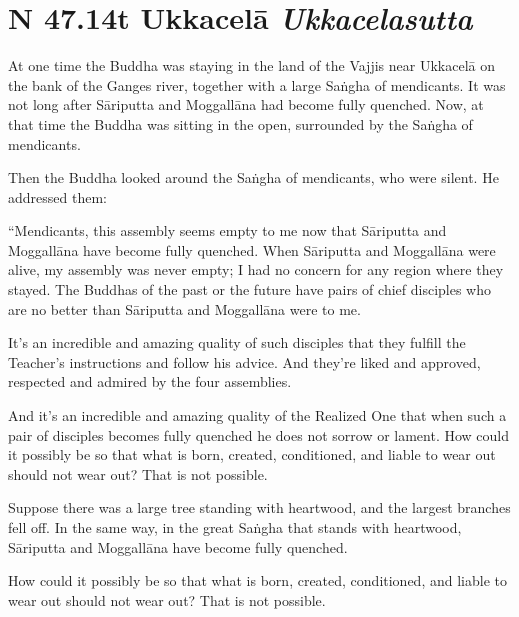 \documentclass[12pt,openany]{book}%
\newcommand*{\suttatitleacronym}[1]{\smaller[2]{#1}\vspace*{.3em}}
\newcommand*{\suttatitletranslation}[1]{\linebreak{#1}}
\newcommand*{\suttatitleroot}[1]{\linebreak\smaller[2]\itshape{#1}}
\newcommand*{\tocacronym}[1]{\hspace*{-3.3em}{#1}\quad}
\newcommand*{\toctranslation}[1]{#1}
\newcommand*{\tocroot}[1]{(\textit{#1})}
\begin{document}
%
\section*{{\suttatitleacronym SN 47.14}{\suttatitletranslation At Ukkacelā }{\suttatitleroot Ukkacelasutta}}
\addcontentsline{toc}{section}{\tocacronym{SN 47.14} \toctranslation{At Ukkacelā } \tocroot{Ukkacelasutta}}

At one time the Buddha was staying in the land of the Vajjis near \textsanskrit{Ukkacelā} on the bank of the Ganges river, together with a large \textsanskrit{Saṅgha} of mendicants. It was not long after \textsanskrit{Sāriputta} and \textsanskrit{Moggallāna} had become fully quenched. Now, at that time the Buddha was sitting in the open, surrounded by the \textsanskrit{Saṅgha} of mendicants. 

Then the Buddha looked around the \textsanskrit{Saṅgha} of mendicants, who were silent. He addressed them: 

“Mendicants, this assembly seems empty to me now that \textsanskrit{Sāriputta} and \textsanskrit{Moggallāna} have become fully quenched. When \textsanskrit{Sāriputta} and \textsanskrit{Moggallāna} were alive, my assembly was never empty; I had no concern for any region where they stayed. The Buddhas of the past or the future have pairs of chief disciples who are no better than \textsanskrit{Sāriputta} and \textsanskrit{Moggallāna} were to me. 

It’s an incredible and amazing quality of such disciples that they fulfill the Teacher’s instructions and follow his advice. And they’re liked and approved, respected and admired by the four assemblies. 

And it’s an incredible and amazing quality of the Realized One that when such a pair of disciples becomes fully quenched he does not sorrow or lament. How could it possibly be so that what is born, created, conditioned, and liable to wear out should not wear out? That is not possible. 

Suppose there was a large tree standing with heartwood, and the largest branches fell off. In the same way, in the great \textsanskrit{Saṅgha} that stands with heartwood, \textsanskrit{Sāriputta} and \textsanskrit{Moggallāna} have become fully quenched. 

How could it possibly be so that what is born, created, conditioned, and liable to wear out should not wear out? That is not possible. 
\end{document}
